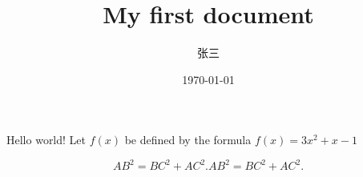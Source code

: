 \documentclass{ctexart} %
\title{\heiti My first document}
\author{\kaishu 张三}
\date{\today}
\begin{document}
\maketitle
Hello world!
Let $f(x)$ be defined by the formula $f(x)=3x^2+x-1$

\begin{equation}
  AB^2 = BC^2+AC^2.
  AB^2 = BC^2+AC^2.
\end{equation}
\end{document}
